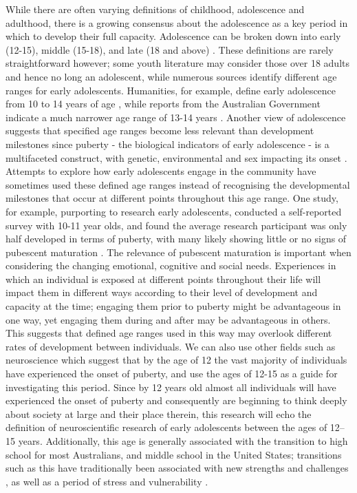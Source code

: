 While there are often varying definitions of childhood, adolescence and adulthood, there is a growing consensus about the adolescence as a key period in which to develop their full capacity. Adolescence can be broken down into early (12-15), middle (15-18), and late (18 and above) \citep{Abela2011}. These definitions are rarely straightforward however; some youth literature may consider those over 18 adults and hence no long an adolescent, while numerous sources identify different age ranges for early adolescents. Humanities, for example, define early adolescence from 10 to 14 years of age \citep{JEA}, while reports from the Australian Government indicate a much narrower age range of 13-14 years \citep{McMatamney2009}. Another view of adolescence suggests that specified age ranges become less relevant than development milestones since puberty - the biological indicators of early adolescence - is a multifaceted construct, with genetic, environmental and sex impacting its onset \citep{Pfeifer2012}. Attempts to explore how early adolescents engage in the community have sometimes used these defined age ranges instead of recognising the developmental milestones that occur at different points throughout this age range. One study, for example, purporting to research early adolescents, conducted a self-reported survey with 10-11 year olds, and found the average research participant was only half developed in terms of puberty, with many likely showing little or no signs of pubescent maturation \citep{Lerner2005}. The relevance of pubescent maturation is important when considering the changing emotional, cognitive and social needs. Experiences in which an individual is exposed at different points throughout their life will impact them in different ways according to their level of development and capacity at the time; engaging them prior to puberty might be advantageous in one way, yet engaging them during and after may be advantageous in others. 
This suggests that defined age ranges used in this way may overlook different rates of development between individuals. We can also use other fields such as neuroscience which suggest that by the age of 12 the vast majority of individuals have experienced the onset of puberty, and use the ages of 12-15 as a guide for investigating this period. Since by 12 years old almost all individuals will have experienced the onset of puberty \citep{Pfeifer2012} and consequently are beginning to think deeply about society at large and their place therein, this research will echo the definition of neuroscientific research of early adolescents between the ages of 12–15 years. Additionally, this age is generally associated with the transition to high school for most Australians, and middle school in the United States; transitions such as this have traditionally been associated with new strengths and challenges \citep{Urdan1998}, as well as a period of stress and vulnerability \cite{Eccles2004}.
 
